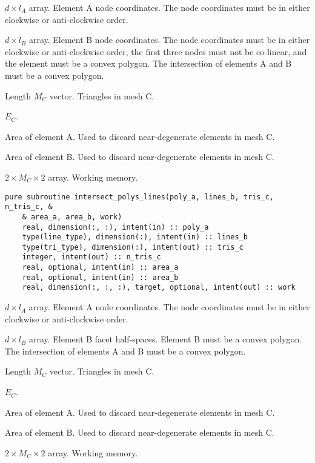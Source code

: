 \documentclass{article}
\begin{document}
\begin{description}[font=\ttfamily\bfseries,leftmargin=2.2\parindent,labelindent=1.7\parindent,noitemsep]
  \item[poly\_a] $d \times l_A$ array. Element A node coordinates. The node
    coordinates must be in either clockwise or anti-clockwise order.
  \item[poly\_b] $d \times l_B$ array. Element B node coordinates. The node
    coordinates must be in either clockwise or anti-clockwise order, the first
    three nodes must not be co-linear, and the element must be a convex polygon.
    The intersection of elements A and B must be a convex polygon.
  \item[tris\_c] Length $M_C$ vector. Triangles in mesh C.
  \item[n\_tris\_c] $E_C$.
  \item[area\_a] Area of element A. Used to discard near-degenerate elements in
    mesh C.
  \item[area\_b] Area of element B. Used to discard near-degenerate elements in
    mesh C.
  \item[work] $2 \times M_C \times 2$ array. Working memory.
\end{description}

\begin{lstlisting}[language=FORTRAN]
  pure subroutine intersect_polys_lines(poly_a, lines_b, tris_c, n_tris_c, &
    & area_a, area_b, work)
    real, dimension(:, :), intent(in) :: poly_a
    type(line_type), dimension(:), intent(in) :: lines_b
    type(tri_type), dimension(:), intent(out) :: tris_c
    integer, intent(out) :: n_tris_c
    real, optional, intent(in) :: area_a
    real, optional, intent(in) :: area_b
    real, dimension(:, :, :), target, optional, intent(out) :: work
\end{lstlisting}

\begin{description}[font=\ttfamily\bfseries,leftmargin=2.2\parindent,labelindent=1.7\parindent,noitemsep]
  \item[poly\_a] $d \times l_A$ array. Element A node coordinates. The node
    coordinates must be in either clockwise or anti-clockwise order.
  \item[lines\_b] $d \times l_B$ array. Element B facet half-spaces. Element B
    must be a convex polygon.
    The intersection of elements A and B must be a convex polygon.
  \item[tris\_c] Length $M_C$ vector. Triangles in mesh C.
  \item[n\_tris\_c] $E_C$.
  \item[area\_a] Area of element A. Used to discard near-degenerate elements in
    mesh C.
  \item[area\_b] Area of element B. Used to discard near-degenerate elements in
    mesh C.
  \item[work] $2 \times M_C \times 2$ array. Working memory.
\end{description}
\end{document}
